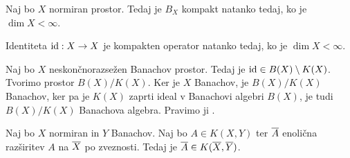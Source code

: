 \begin{izrek}
  Naj bo $X$ normiran prostor.
  Tedaj je $B_X$ kompakt natanko tedaj, ko je $\dim X < \infty$.
\end{izrek}

\begin{posledica}
  Identiteta $\operatorname{id}: X \to X$ je kompakten operator natanko tedaj, ko je $\dim X <
  \infty$.
\end{posledica}

Naj bo $X$ neskončnorazsežen Banachov prostor.
Tedaj je $\operatorname{id} \in B(X) \setminus K(X)$.
Tvorimo prostor $B(X) / K(X)$.
Ker je $X$ Banachov, je $B(X)/K(X)$ Banachov, ker pa je $K(X)$ zaprti ideal v
Banachovi algebri $B(X)$, je tudi $B(X) / K(X)$ Banachova algebra.
Pravimo ji .

\begin{trditev}
  Naj bo $X$ normiran in $Y$ Banachov.
  Naj bo $A \in K(X,Y)$ ter $\overline{A}$ enolična razširitev $A$ na $\overline{X}$ po
  zveznosti.
  Tedaj je $\overline{A} \in K(\overline{X}, \overline{Y})$.
\end{trditev}

